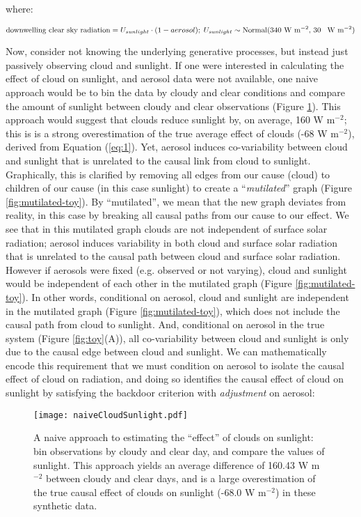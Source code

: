 \documentclass[12pt]{article}
\begin{document}
where:

\begin{equation*} \text{downwelling clear sky radiation} =
  U_{sunlight} \cdot (1 - aerosol); \; U_{sunlight} \sim
  \text{Normal(340 W m$^{-2}$, 30 \, W m$^{-2}$)}
\end{equation*}

Now, consider not knowing the underlying generative processes, but
instead just passively observing cloud and sunlight. If one were
interested in calculating the effect of cloud on sunlight, and aerosol
data were not available, one naive approach would be to bin the data
by cloudy and clear conditions and compare the amount of sunlight
between cloudy and clear observations (Figure
\ref{fig:naive-cloud-sunlight}). This approach would suggest that
clouds reduce sunlight by, on average, 160 W m$^{-2}$; this is is a
strong overestimation of the true average effect of clouds (-68 W
m$^{-2}$), derived from Equation (\ref{eq:1}). Yet, aerosol induces
co-variability between cloud and sunlight that is unrelated to the
causal link from cloud to sunlight. Graphically, this is clarified by
removing all edges from our cause (cloud) to children of our cause (in
this case sunlight) to create a ``\emph{mutilated}'' graph (Figure
\ref{fig:mutilated-toy}). By ``mutilated'', we mean that the new graph
deviates from reality, in this case by breaking all causal paths from
our cause to our effect. We see that in this mutilated graph clouds
are not independent of surface solar radiation; aerosol induces
variability in both cloud and surface solar radiation that is
unrelated to the causal path between cloud and surface solar
radiation.  However if aerosols were fixed (e.g. observed or not
varying), cloud and sunlight would be independent of each other in the
mutilated graph (Figure \ref{fig:mutilated-toy}). In other words,
conditional on aerosol, cloud and sunlight are independent in the
mutilated graph (Figure \ref{fig:mutilated-toy}), which does not
include the causal path from cloud to sunlight. And, conditional on
aerosol in the true system (Figure \ref{fig:toy}(A)), all
co-variability between cloud and sunlight is only due to the causal
edge between cloud and sunlight.  We can mathematically encode this
requirement that we must condition on aerosol to isolate the causal
effect of cloud on radiation, and doing so identifies the causal
effect of cloud on sunlight by satisfying the backdoor criterion with
\textit{adjustment} on aerosol:

\begin{figure} \texttt{[image: naiveCloudSunlight.pdf]}
  \caption{A naive approach to estimating the ``effect'' of clouds on
    sunlight: bin observations by cloudy and clear day, and compare the
    values of sunlight. This approach yields an average difference of
    160.43 W m$^{-2}$ between cloudy and clear days, and is a large
    overestimation of the true causal effect of clouds on sunlight (-68.0
    W m$^{-2}$) in these synthetic data.}
  \label{fig:naive-cloud-sunlight}
\end{figure}
\end{document}
